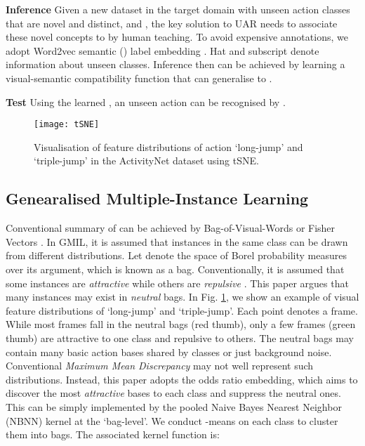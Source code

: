 \documentclass[10pt,twocolumn,letterpaper]{article}
\begin{document}
\noindent\textbf{Inference} Given a new dataset in the target domain  with  unseen action classes that are novel and distinct, \ie  and , the key solution to UAR needs to associate these novel concepts to  by human teaching. To avoid expensive annotations, we adopt Word2vec semantic () label embedding . Hat and subscript  denote information about unseen classes. Inference then can be  achieved by learning a visual-semantic compatibility function  that can generalise to .

\noindent\textbf{Test} Using the learned , an unseen action  can be recognised by .

\begin{figure}
	\centering
	\texttt{[image: tSNE]}
	\vspace{1ex}
	\caption{Visualisation of feature distributions of action `long-jump' and `triple-jump' in the ActivityNet dataset using tSNE. \label{tSNE}}
	\vspace{-2ex}
\end{figure}

\subsection{Genearalised Multiple-Instance Learning}
Conventional summary of  can be achieved by Bag-of-Visual-Words or Fisher Vectors \cite{FisherVector}. 
In GMIL, it is assumed that instances in the same class can be drawn from different distributions. Let  denote the space of Borel probability measures over its argument, which is known as a bag. Conventionally, it is assumed that some instances are \textit{attractive}  while others are \textit{repulsive} . This paper argues that many instances may exist in \textit{neutral} bags. In Fig. \ref{tSNE}, we show an example of visual feature distributions of `long-jump' and `triple-jump'. Each point denotes a frame. While most frames fall in the neutral bags (red thumb), only a few frames (green thumb) are attractive to one class and repulsive to others. The neutral bags may contain many basic action bases shared by classes or just background noise. Conventional \textit{Maximum Mean Discrepancy} \cite{GMIL_2016_IJCAI} may not well represent such distributions. Instead, this paper adopts the odds ratio embedding, which aims to discover the most \textit{attractive} bases to each class  and suppress the neutral ones. This can be simply implemented by the pooled Naive Bayes Nearest Neighbor (NBNN) kernel \cite{pooled_nbnn} at the `bag-level'. We conduct -means on each class to cluster them into  bags. The associated kernel function is:
\end{document}
